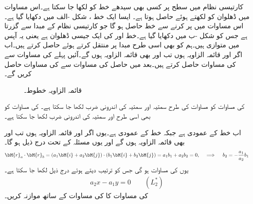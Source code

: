 کارتیسی نظام میں  سطح پر کسی بھی سیدھے خط کو  لکھا جا سکتا ہے۔اس مساوات میں ڈھلوان  کو    لکھتے ہوئے  حاصل ہوتا ہے۔ ایسا ایک خط ، شکل -الف میں دکھایا گیا ہے۔اس مساوات میں  پر کرنے سے خط  حاصل ہو گا جو کارتیسی نظام کے مبدا  سے گزرتا ہے جس کو شکل -ب میں  دکھایا گیا ہے۔خط  اور  کی ایک جیسی ڈھلوان ہے یعنی یہ آپس میں متوازی ہیں۔ہم   کو بھی اسی طرح مبدا پر منتقل کرتے ہوئے  حاصل کرتے ہیں۔اب اگر  اور  قائمہ الزاویہ ہوں تب  اور  بھی قائمہ الزاویہ ہوں گے۔آئیں پہلے  کی مساوات سے  کی مساوات حاصل کرتے ہیں۔بعد میں حاصل  کی مساوات سے  کی مساوات حاصل کریں گے۔ 
\begin{figure}
\centering
{}
\caption{قائمہ الزاویہ خطوط۔}
\label{شکل_الجبرا_قائمہ_الزاویہ_خطوط}
\end{figure}

 کی مساوات   کو مساوات  کی طرح سمتیہ  اور سمتیہ  کی اندرونی ضرب   لکھا جا سکتا ہے۔ کی مساوات کو بھی اسی طرح  اور سمتیہ  کی اندرونی ضرب
   لکھا جا سکتا ہے۔

اب  خط  کے عمودی ہے جبکہ  خط  کے عمودی ہے۔یوں اگر  اور  قائمہ الزاویہ ہوں تب  اور  بھی قائمہ الزاویہ ہوں گے اور یوں مسئلہ   کے تحت درج ذیل ہو گا۔
\begin{align*}
\bM{r}_a\cdot \bM{r}_b=(a_1\bM{i}+a_2\bM{j})\cdot(b_1\bM{i}+b_2\bM{j})=a_1b_1+a_2b_2=0,\quad \implies \quad b_2=-\frac{a_1}{a_2}b_1
\end{align*}
یوں  کی مساوات  ہو گی جس کو ترتیب دیتے ہوئے درج ذیل لکھا جا سکتا ہے۔
\begin{align}
a_2x-a_1y=0\quad \quad (L_2^*)
\end{align}
  کی مساوات کا  کی مساوات  کے ساتھ موازنہ کریں۔

